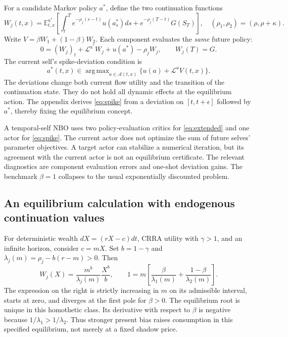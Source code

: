 \documentclass[ecta,draft]{econsocart}
\theoremstyle{definition}
\theoremstyle{remark}
\newcommand{\E}{\mathbb E}
\newcommand{\LL}{\mathcal L}
\newcommand{\Act}{\mathcal A}
\DeclareMathOperator*{\argmax}{arg\,max}
\begin{document}
For a candidate Markov policy $a^*$, define the two continuation functions
\begin{equation}\label{eq:components}
 W_j(t,x)=\E_{t,x}^{a^*}\left[\int_t^T e^{-\rho_j(s-t)}u(a_s^*)ds
             +e^{-\rho_j(T-t)}G(S_T)\right],\quad
 (\rho_1,\rho_2)=(\rho,\rho+\kappa).
\end{equation}
Write $V=\beta W_1+(1-\beta)W_2$. Each component evaluates the \emph{same} future policy:
\begin{equation}\label{eq:extended}
 0=(W_j)_t+\LL^{a^*}W_j+u(a^*)-\rho_jW_j,\qquad W_j(T)=G.
\end{equation}
The current self's spike-deviation condition is
\begin{equation}\label{eq:spike}
 a^*(t,x)\in\argmax_{a\in\Act(t,x)}\{u(a)+\LL^aV(t,x)\}.
\end{equation}
The deviations change both current flow utility and the transition of the continuation state. They do not hold all dynamic effects at the equilibrium action. The appendix derives \eqref{eq:spike} from a deviation on $[t,t+\epsilon]$ followed by $a^*$, thereby fixing the equilibrium concept.

A temporal-self NBO uses two policy-evaluation critics for \eqref{eq:extended} and one actor for \eqref{eq:spike}. The current actor does not optimize the sum of future selves' parameter objectives. A target actor can stabilize a numerical iteration, but its agreement with the current actor is not an equilibrium certificate. The relevant diagnostics are component evaluation errors and one-shot deviation gains. The benchmark $\beta=1$ collapses to the usual exponentially discounted problem.

\subsection{An equilibrium calculation with endogenous continuation values}
For deterministic wealth $dX=(rX-c)dt$, CRRA utility with $\gamma>1$, and an infinite horizon, consider $c=mX$. Set $b=1-\gamma$ and $\lambda_j(m)=\rho_j-b(r-m)>0$. Then
\begin{equation}\label{eq:temporalroot}
 W_j(X)=\frac{m^b}{\lambda_j(m)}\frac{X^b}{b},\qquad
 1=m\left[\frac\beta{\lambda_1(m)}+\frac{1-\beta}{\lambda_2(m)}\right].
\end{equation}
The expression on the right is strictly increasing in $m$ on its admissible interval, starts at zero, and diverges at the first pole for $\beta>0$. The equilibrium root is unique in this homothetic class. Its derivative with respect to $\beta$ is negative because $1/\lambda_1>1/\lambda_2$. Thus stronger present bias raises consumption in this specified equilibrium, not merely at a fixed shadow price.
\end{document}
